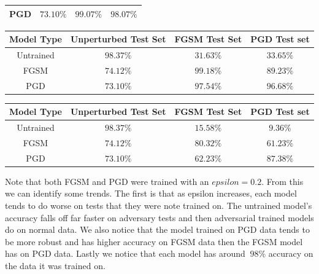\documentclass{article}
\begin{document}
\begin{titlepage}
\begin{center}
\begin{tabular}{| c || c | c | c |}
 \hline
 PGD & $73.10\%$ & $99.07\%$ & $98.07\%$ \\ 
 \hline
\end{tabular}
\end{center}
\begin{center}
\begin{tabular}{| c || c | c | c |} 
 \hline
Model Type & Unperturbed Test Set  & FGSM Test Set & PGD Test set\\ [0.5ex] 
 \hline
 Untrained & $98.37\%$ & $31.63\%$ & $33.65\%$ \\ 
 \hline
 FGSM & $74.12\%$ & $99.18\%$ & $89.23\%$ \\ 
 \hline
 PGD & $73.10\%$ & $97.54\%$ & $96.68\%$ \\ 
 \hline
\end{tabular}
\end{center}
\begin{center}
\begin{tabular}{| c || c | c | c |} 
 \hline
Model Type & Unperturbed Test Set  & FGSM Test Set & PGD Test set\\ [0.5ex] 
 \hline
 Untrained & $98.37\%$ & $15.58\%$ & $9.36\%$ \\ 
 \hline
 FGSM & $74.12\%$ & $80.32\%$ & $61.23\%$ \\ 
 \hline
 PGD & $73.10\%$ & $62.23\%$ & $87.38\%$ \\ 
 \hline
\end{tabular}
\end{center}
Note that both FGSM and PGD were trained with an $epsilon = 0.2$. From this we can identify some trends. The first is that as epsilon increases, each model tends to do worse on tests that they were note trained on. The untrained model's accuracy falls off far faster on adversary tests and then adversarial trained models do on normal data. We also notice that the model trained on PGD data tends to be more robust and has higher accuracy on FGSM data then the FGSM model has on PGD data. Lastly we notice that each model has around $~98\%$ accuracy on the data it was trained on.
\end{titlepage}
\end{document}
